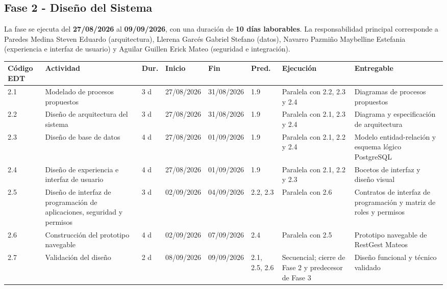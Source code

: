 \documentclass[12pt,a4paper]{article}
\begin{document}
\begin{landscape}
\subsection{Fase 2 - Diseño del Sistema}

La fase se ejecuta del \textbf{27/08/2026} al \textbf{09/09/2026}, con una duración de \textbf{10 días laborables}. 
La responsabilidad principal corresponde a Paredes Medina Steven Eduardo (arquitectura), Llerena Garcés Gabriel Stefano (datos), Navarro Pazmiño Maybelline Estefania (experiencia e interfaz de usuario) y Aguilar Guillen Erick Mateo (seguridad e integración).

\begin{center}
\setlength{\tabcolsep}{3pt}
\renewcommand{\arraystretch}{1.15}
\fontsize{7.2}{8.5}\selectfont
\begin{tabularx}{\linewidth}{|p{0.85cm}|p{4.0cm}|p{0.75cm}|p{1.45cm}|p{1.45cm}|p{1.4cm}|p{4.0cm}|X|}
\hline
\rowcolor{tableheader}
\textbf{Código EDT} & \textbf{Actividad} & \textbf{Dur.} & \textbf{Inicio} & \textbf{Fin} & \textbf{Pred.} & \textbf{Ejecución} & \textbf{Entregable} \\ \hline
2.1 & Modelado de procesos propuestos & 3 d & 27/08/2026 & 31/08/2026 & 1.9 & Paralela con 2.2, 2.3 y 2.4 & Diagramas de procesos propuestos \\ \hline
2.2 & Diseño de arquitectura del sistema & 3 d & 27/08/2026 & 31/08/2026 & 1.9 & Paralela con 2.1, 2.3 y 2.4 & Diagrama y especificación de arquitectura \\ \hline
2.3 & Diseño de base de datos & 4 d & 27/08/2026 & 01/09/2026 & 1.9 & Paralela con 2.1, 2.2 y 2.4 & Modelo entidad-relación y esquema lógico PostgreSQL \\ \hline
2.4 & Diseño de experiencia e interfaz de usuario & 4 d & 27/08/2026 & 01/09/2026 & 1.9 & Paralela con 2.1, 2.2 y 2.3 & Bocetos de interfaz y diseño visual \\ \hline
2.5 & Diseño de interfaz de programación de aplicaciones, seguridad y permisos & 3 d & 02/09/2026 & 04/09/2026 & 2.2, 2.3 & Paralela con 2.6 & Contratos de interfaz de programación y matriz de roles y permisos \\ \hline
2.6 & Construcción del prototipo navegable & 4 d & 02/09/2026 & 07/09/2026 & 2.4 & Paralela con 2.5 & Prototipo navegable de RestGest Mateos \\ \hline
2.7 & Validación del diseño & 2 d & 08/09/2026 & 09/09/2026 & 2.1, 2.5, 2.6 & Secuencial; cierre de Fase 2 y predecesor de Fase 3 & Diseño funcional y técnico validado \\ \hline
\end{tabularx}
\end{center}
\end{landscape}
\end{document}
